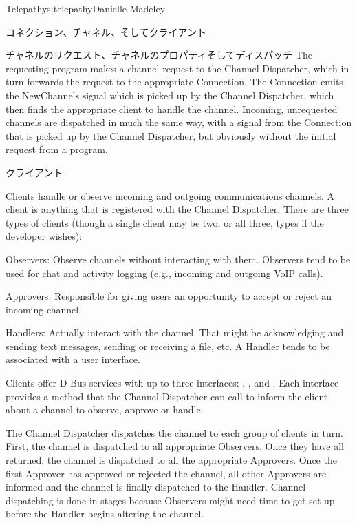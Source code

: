 \begin{aosachapter}{Telepathy}{s:telepathy}{Danielle Madeley}
\begin{aosasect1}{コネクション、チャネル、そしてクライアント}
\begin{aosasect2}{チャネルのリクエスト、チャネルのプロパティそしてディスパッチ}
The requesting program makes a channel request to the Channel
Dispatcher, which in turn forwards the request to the appropriate
Connection. The Connection emits the NewChannels signal which is
picked up by the Channel Dispatcher, which then finds the appropriate
client to handle the channel.  Incoming, unrequested channels are
dispatched in much the same way, with a signal from the Connection
that is picked up by the Channel Dispatcher, but obviously without the
initial request from a program.

\end{aosasect2}

\begin{aosasect2}{クライアント}

Clients handle or observe incoming and outgoing communications
channels. A client is anything that is registered with the Channel
Dispatcher.  There are three types of clients (though a single client
may be two, or all three, types if the developer wishes):

\begin{aosadescription}

  \item{Observers}: Observe channels without interacting with
    them. Observers tend to be used for chat and activity logging
    (e.g., incoming and outgoing VoIP calls).

  \item{Approvers}: Responsible for giving users an opportunity to
    accept or reject an incoming channel.

  \item{Handlers}: Actually interact with the channel. That might be
    acknowledging and sending text messages, sending or receiving a
    file, etc. A Handler tends to be associated with a user interface.

\end{aosadescription}

Clients offer D-Bus services with up to three interfaces:
, , and
. Each interface provides a method that the
Channel Dispatcher can call to inform the client about a channel to
observe, approve or handle.

The Channel Dispatcher dispatches the channel to each group of clients
in turn. First, the channel is dispatched to all appropriate
Observers.  Once they have all returned, the channel is dispatched to
all the appropriate Approvers. Once the first Approver has approved or
rejected the channel, all other Approvers are informed and the channel
is finally dispatched to the Handler.  Channel dispatching is done in
stages because Observers might need time to get set up before the
Handler begins altering the channel.


\end{aosasect2}
\end{aosasect1}
\end{aosachapter}
